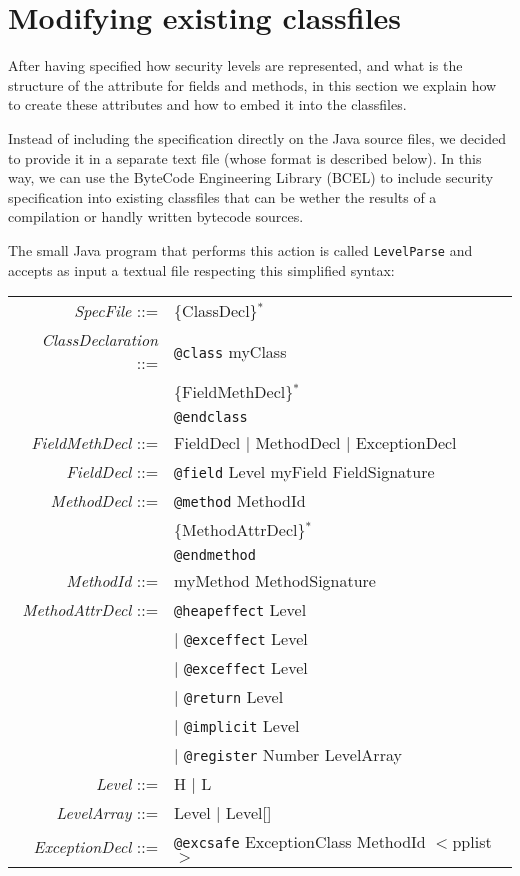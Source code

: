 \documentclass [a4paper,twoside]{article}
\begin{document}
\section{Modifying existing classfiles}
\label{sec:modify}

After having specified how security levels are represented, and what
is the structure of the attribute for fields and methods, in this
section we explain how to create these attributes and how to embed it
into the classfiles.

Instead of including the specification directly on the Java source
files, we decided to provide it in a separate text file (whose format
is described below). In this way, we can use the ByteCode Engineering
Library (BCEL)\cite{bcel} to include security specification into existing
classfiles that can be wether the results of a compilation or handly
written bytecode sources. 

The small Java program that performs this action is called
\texttt{LevelParse} and accepts as input a textual file respecting
this simplified syntax:

\begin{center}
\begin{tabular}{rl}
\textit{SpecFile} ::=& \{ClassDecl\}$^*$\\
\textit{ClassDeclaration} ::=&\texttt{@class} myClass \\
& \{FieldMethDecl\}$^*$ \\
& \texttt{@endclass}\\
\textit{FieldMethDecl} ::=& FieldDecl $|$ MethodDecl $|$ ExceptionDecl\\
\textit{FieldDecl} ::=& \texttt{@field} Level myField FieldSignature\\
\textit{MethodDecl} ::=& \texttt{@method} MethodId\\
& \{MethodAttrDecl\}$^*$\\
& \texttt{@endmethod}\\
\textit{MethodId} ::=& myMethod MethodSignature\\
\textit{MethodAttrDecl} ::=& \texttt{@heapeffect} Level \\
& $|$ \texttt{@exceffect} Level\\
& $|$ \texttt{@exceffect} Level\\
& $|$ \texttt{@return} Level\\
& $|$ \texttt{@implicit} Level\\
& $|$ \texttt{@register} Number LevelArray\\
\textit{Level} ::=& H $|$ L\\
\textit{LevelArray} ::=& Level $|$ Level[]\\
\textit{ExceptionDecl} ::=& \texttt{@excsafe} ExceptionClass MethodId $<$pplist$>$\\
\end{tabular}
\end{center}
\end{document}
